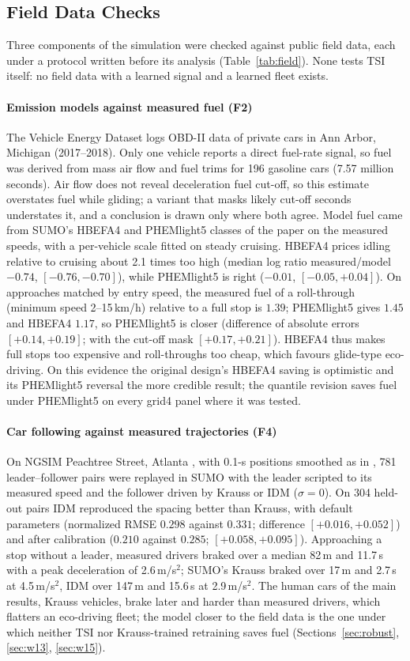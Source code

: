 \subsection{Field Data Checks}\label{sec:field}
Three components of the simulation were checked against public field data, each under a protocol written before its analysis
(Table~\ref{tab:field}). None tests TSI itself: no field data with a learned signal and a learned fleet exists.
\paragraph{Emission models against measured fuel (F2)} The Vehicle Energy Dataset \cite{oh2020ved} logs OBD-II data of private cars in Ann
Arbor, Michigan (2017--2018). Only one vehicle reports a direct fuel-rate signal, so fuel was derived from mass air flow and fuel trims
for 196 gasoline cars (7.57 million seconds). Air flow does not reveal deceleration fuel cut-off, so this estimate overstates fuel while
gliding; a variant that masks likely cut-off seconds understates it, and a conclusion is drawn only where both agree. Model fuel came
from SUMO's HBEFA4 and PHEMlight5 classes of the paper on the measured speeds, with a per-vehicle scale fitted on steady cruising.
HBEFA4 prices idling relative to cruising about 2.1 times too high (median log ratio measured/model $-0.74$, $[-0.76,-0.70]$), while
PHEMlight5 is right ($-0.01$, $[-0.05,+0.04]$). On approaches matched by entry speed, the measured fuel of a roll-through (minimum speed
2--15\,km/h) relative to a full stop is $1.39$; PHEMlight5 gives $1.45$ and HBEFA4 $1.17$, so PHEMlight5 is closer (difference of absolute
errors $[+0.14,+0.19]$; with the cut-off mask $[+0.17,+0.21]$). HBEFA4 thus makes full stops too expensive and roll-throughs too cheap, which
favours glide-type eco-driving. On this evidence the original design's HBEFA4 saving is optimistic and its PHEMlight5 reversal the more
credible result; the quantile revision saves fuel under PHEMlight5 on every grid4 panel where it was tested.
\paragraph{Car following against measured trajectories (F4)} On NGSIM Peachtree Street, Atlanta \cite{ngsim}, with 0.1-s positions
smoothed as in \cite{thiemann2008}, 781 leader--follower pairs were replayed in SUMO with the leader scripted to its measured speed and the
follower driven by Krauss or IDM ($\sigma=0$). On 304 held-out pairs IDM reproduced the spacing better than Krauss, with default parameters
(normalized RMSE $0.298$ against $0.331$; difference $[+0.016,+0.052]$) and after calibration ($0.210$ against $0.285$; $[+0.058,+0.095]$).
Approaching a stop without a leader, measured drivers braked over a median 82\,m and 11.7\,s with a peak deceleration of 2.6\,m/s$^2$;
SUMO's Krauss braked over 17\,m and 2.7\,s at 4.5\,m/s$^2$, IDM over 147\,m and 15.6\,s at 2.9\,m/s$^2$. The human cars of the main
results, Krauss vehicles, brake later and harder than measured drivers, which flatters an eco-driving fleet; the model closer to the
field data is the one under which neither TSI nor Krauss-trained retraining saves fuel (Sections~\ref{sec:robust}, \ref{sec:w13},
\ref{sec:w15}).

